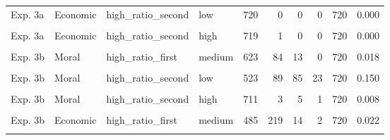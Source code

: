 \documentclass[
]{article}
\begin{document}
\begin{table}[!h]
{\begin{tabular}[t]{llllrrrrrr}
Exp. 3a & Economic & high\_ratio\_second & low & 720 & 0 & 0 & 0 & 720 & 0.000\\
\addlinespace
\cellcolor{gray!10}{Exp. 3a} & \cellcolor{gray!10}{Economic} & \cellcolor{gray!10}{high\_ratio\_second} & \cellcolor{gray!10}{medium} & \cellcolor{gray!10}{718} & \cellcolor{gray!10}{2} & \cellcolor{gray!10}{0} & \cellcolor{gray!10}{0} & \cellcolor{gray!10}{720} & \cellcolor{gray!10}{0.000}\\
Exp. 3a & Economic & high\_ratio\_second & high & 719 & 1 & 0 & 0 & 720 & 0.000\\
\cellcolor{gray!10}{Exp. 3b} & \cellcolor{gray!10}{Moral} & \cellcolor{gray!10}{high\_ratio\_first} & \cellcolor{gray!10}{low} & \cellcolor{gray!10}{626} & \cellcolor{gray!10}{24} & \cellcolor{gray!10}{67} & \cellcolor{gray!10}{3} & \cellcolor{gray!10}{720} & \cellcolor{gray!10}{0.097}\\
Exp. 3b & Moral & high\_ratio\_first & medium & 623 & 84 & 13 & 0 & 720 & 0.018\\
\cellcolor{gray!10}{Exp. 3b} & \cellcolor{gray!10}{Moral} & \cellcolor{gray!10}{high\_ratio\_first} & \cellcolor{gray!10}{high} & \cellcolor{gray!10}{611} & \cellcolor{gray!10}{29} & \cellcolor{gray!10}{77} & \cellcolor{gray!10}{3} & \cellcolor{gray!10}{720} & \cellcolor{gray!10}{0.111}\\
\addlinespace
Exp. 3b & Moral & high\_ratio\_second & low & 523 & 89 & 85 & 23 & 720 & 0.150\\
\cellcolor{gray!10}{Exp. 3b} & \cellcolor{gray!10}{Moral} & \cellcolor{gray!10}{high\_ratio\_second} & \cellcolor{gray!10}{medium} & \cellcolor{gray!10}{539} & \cellcolor{gray!10}{165} & \cellcolor{gray!10}{10} & \cellcolor{gray!10}{6} & \cellcolor{gray!10}{720} & \cellcolor{gray!10}{0.022}\\
Exp. 3b & Moral & high\_ratio\_second & high & 711 & 3 & 5 & 1 & 720 & 0.008\\
\cellcolor{gray!10}{Exp. 3b} & \cellcolor{gray!10}{Economic} & \cellcolor{gray!10}{high\_ratio\_first} & \cellcolor{gray!10}{low} & \cellcolor{gray!10}{463} & \cellcolor{gray!10}{205} & \cellcolor{gray!10}{49} & \cellcolor{gray!10}{3} & \cellcolor{gray!10}{720} & \cellcolor{gray!10}{0.072}\\
Exp. 3b & Economic & high\_ratio\_first & medium & 485 & 219 & 14 & 2 & 720 & 0.022\\
\addlinespace
\cellcolor{gray!10}{Exp. 3b} & \cellcolor{gray!10}{Economic} & \cellcolor{gray!10}{high\_ratio\_first} & \cellcolor{gray!10}{high} & \cellcolor{gray!10}{539} & \cellcolor{gray!10}{104} & \cellcolor{gray!10}{65} & \cellcolor{gray!10}{12} & \cellcolor{gray!10}{720} & \cellcolor{gray!10}{0.107}\\

\end{tabular}}
\end{table}
\end{document}
